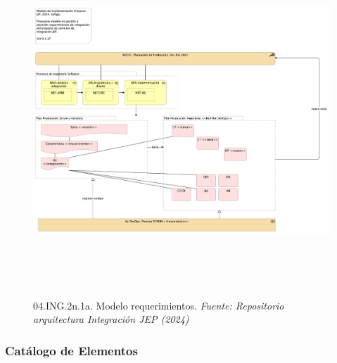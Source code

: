 \documentclass[
  paper=a4,
  ,captions=tableheading
]{scrartcl}
\begin{document}
\begin{figure}
\centering
\includegraphics[width=\textwidth,height=5.20833in]{images/04.ING.2n.1a.Modelorequerimientos.png}
\caption{04.ING.2n.1a. Modelo requerimientos. \emph{Fuente: Repositorio
arquitectura Integración JEP
(2024)}}\label{fig:id-7c3abdaa8d9b46eebfd8f8e3e8d912ce}
\end{figure}

\subsubsection{Catálogo de
Elementos}\label{sec:catuxe1logo-de-elementos}
\end{document}
